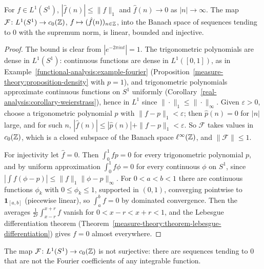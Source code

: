 \begin{proposition}\label{functional-analysis:proposition-riemann-lebesgue}
For $f \in L^1(S^1)$, $|\hat f(n)| \leq \|f\|_1$ and $\hat f(n) \to 0$ as $|n| \to \infty$. The map $\mathcal{F} \colon L^1(S^1) \to c_0(\mathbb{Z})$, $f \mapsto (\hat f(n))_{n \in \mathbb{Z}}$, into the Banach space of sequences
tending to $0$ with the supremum norm, is linear, bounded and injective.
\end{proposition}

\begin{proof}
The bound is clear from $|e^{-2\pi int}| = 1$. The trigonometric polynomials are dense in $L^1(S^1)$: continuous functions are dense in $L^1([0, 1])$, as in Example~\ref{functional-analysis:example-fourier}
(Proposition~\ref{measure-theory:proposition-density} with $p = 1$), and trigonometric polynomials approximate continuous functions on $S^1$ uniformly (Corollary~\ref{real-analysis:corollary-weierstrass}), hence
in $L^1$ since $\|\cdot\|_1 \leq \|\cdot\|_\infty$. Given $\varepsilon > 0$, choose a trigonometric polynomial $p$ with $\|f - p\|_1 < \varepsilon$; then $\hat p(n) = 0$ for $|n|$ large, and for such $n$,
$|\hat f(n)| \leq |\hat p(n)| + \|f - p\|_1 < \varepsilon$. So $\mathcal{F}$ takes values in $c_0(\mathbb{Z})$, which is a closed subspace of the Banach space $\ell^\infty(\mathbb{Z})$, and $\|\mathcal{F}\| \leq 1$.

For injectivity let $\hat f = 0$. Then $\int_0^1fp = 0$ for every trigonometric polynomial $p$, and by uniform approximation $\int_0^1f\phi = 0$ for every continuous $\phi$ on $S^1$, since
$|\int f(\phi - p)| \leq \|f\|_1\|\phi - p\|_\infty$. For $0 < a < b < 1$ there are continuous functions $\phi_k$ with $0 \leq \phi_k \leq 1$, supported in $(0, 1)$, converging pointwise to $\mathbf{1}_{[a, b]}$
(piecewise linear), so $\int_a^bf = 0$ by dominated convergence. Then the averages $\frac{1}{2r}\int_{x-r}^{x+r}f$ vanish for $0 < x - r < x + r < 1$, and the Lebesgue differentiation theorem
(Theorem~\ref{measure-theory:theorem-lebesgue-differentiation}) gives $f = 0$ almost everywhere.
\end{proof}

\begin{proposition}\label{functional-analysis:proposition-fourier-not-onto}
The map $\mathcal{F} \colon L^1(S^1) \to c_0(\mathbb{Z})$ is not surjective: there are sequences tending to $0$ that are not the Fourier coefficients of any integrable function.
\end{proposition}

